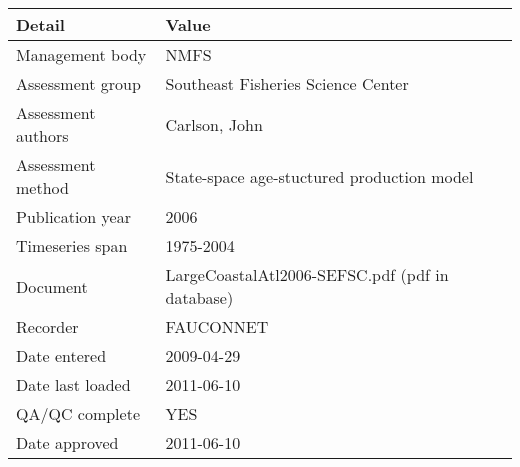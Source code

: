 \begin{table}[htb]
\centering
\begin{tabular}{lp{7cm}}
\toprule
Detail & Value \\
\midrule
Management body    & NMFS                                            \\
Assessment group   & Southeast Fisheries Science Center              \\
Assessment authors & Carlson, John                                   \\
Assessment method  & State-space age-stuctured production model      \\
Publication year   & 2006                                            \\
Timeseries span    & 1975-2004                                       \\
Document           & LargeCoastalAtl2006-SEFSC.pdf (pdf in database) \\
Recorder           & FAUCONNET                                       \\
Date entered       & 2009-04-29                                      \\
Date last loaded   & 2011-06-10                                      \\
QA/QC complete     & YES                                             \\
Date approved      & 2011-06-10                                      \\
\bottomrule
\end{tabular}
\label{tab:assessdet}
\end{table}
